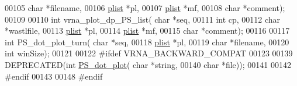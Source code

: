\begin{DoxyCode}
00105                       \textcolor{keywordtype}{char} *filename,
00106                       \mbox{\hyperlink{group__data__structures_structvrna__plist__s}{plist}} *pl,
00107                       \mbox{\hyperlink{group__data__structures_structvrna__plist__s}{plist}} *mf,
00108                       \textcolor{keywordtype}{char} *comment);
00109 
00110 \textcolor{keywordtype}{int} vrna\_plot\_dp\_PS\_list( \textcolor{keywordtype}{char} *seq,
00111                           \textcolor{keywordtype}{int} cp,
00112                           \textcolor{keywordtype}{char} *wastlfile,
00113                           \mbox{\hyperlink{group__data__structures_structvrna__plist__s}{plist}} *pl,
00114                           \mbox{\hyperlink{group__data__structures_structvrna__plist__s}{plist}} *mf,
00115                           \textcolor{keywordtype}{char} *comment);
00116 
00117 \textcolor{keywordtype}{int} PS\_dot\_plot\_turn( \textcolor{keywordtype}{char} *seq,
00118                       \mbox{\hyperlink{group__data__structures_structvrna__plist__s}{plist}} *pl,
00119                       \textcolor{keywordtype}{char} *filename,
00120                       \textcolor{keywordtype}{int} winSize);
00121 
00122 \textcolor{preprocessor}{#ifdef VRNA\_BACKWARD\_COMPAT}
00123 
00139 DEPRECATED(\textcolor{keywordtype}{int} \mbox{\hyperlink{group__plotting__utils_ga689a97a7e3b8a2df14728b8204d9d57b}{PS\_dot\_plot}}( \textcolor{keywordtype}{char} *\textcolor{keywordtype}{string},
00140                             \textcolor{keywordtype}{char} *file));
00141 
00142 \textcolor{preprocessor}{#endif}
00143 
00148 \textcolor{preprocessor}{#endif}
\end{DoxyCode}
